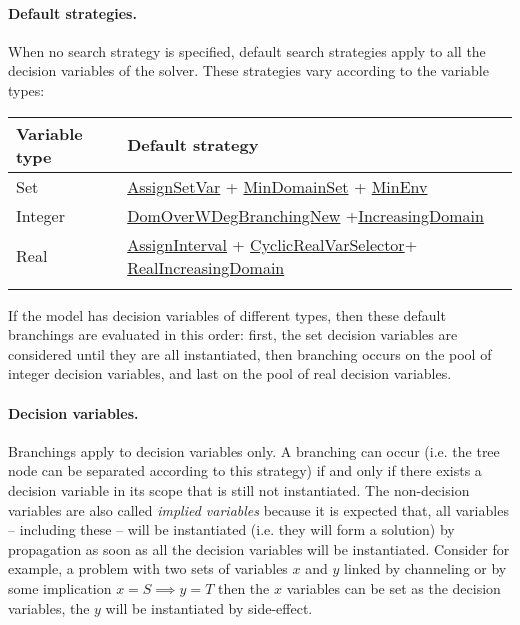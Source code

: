 \paragraph{Default strategies.}
When no search strategy is specified, default search strategies apply to all the decision variables of the solver.
These strategies vary according to the variable types: 

\noindent\begin{tabular}{p{.25\linewidth}p{.7\linewidth}}
\hline
Variable type &  Default strategy \\
\hline
Set &   \hyperlink{assignsetvar:assignsetvarbranchstrat}{AssignSetVar} + \hyperlink{mindomset:mindomsetvarselector}{MinDomainSet} + \hyperlink{minenv:minenvvalselector}{MinEnv} \\
Integer & \hyperlink{domoverwdeg:domoverwdegbranchstrat}{DomOverWDegBranchingNew} +\hyperlink{increasingdomain:increasingdomainvaliterator}{IncreasingDomain}\\
 Real &  \hyperlink{assigninterval:assignintervalbranchstrat}{AssignInterval} + \hyperlink{cyclicrealvarselector:cyclicrealvarselectorvarselector}{CyclicRealVarSelector}+ \hyperlink{realincreasingdomain:realincreasingdomainvaliterator}{RealIncreasingDomain} \\
\hline\\
\end{tabular}
If the model has decision variables of different types, then these default branchings are evaluated in this order: first, the set decision variables are considered until they are all instantiated, then branching occurs on the pool of integer decision variables, and last on the pool of real decision variables.

\paragraph{Decision variables.}
Branchings apply to decision variables only. A branching can occur (i.e. the tree node can be separated according to this strategy) if and only if there exists a decision variable in its scope that is still not instantiated.
The non-decision variables are also called \emph{implied variables} because it is expected that, all variables -- including these -- will be instantiated (i.e. they will form a solution) by propagation as soon as all the decision variables will be instantiated. Consider for example, a problem with two sets of variables $x$ and $y$ linked by channeling or by some implication $x=S\implies y=T$ then the $x$ variables can be set as the decision variables, the $y$ will be instantiated by side-effect. 

